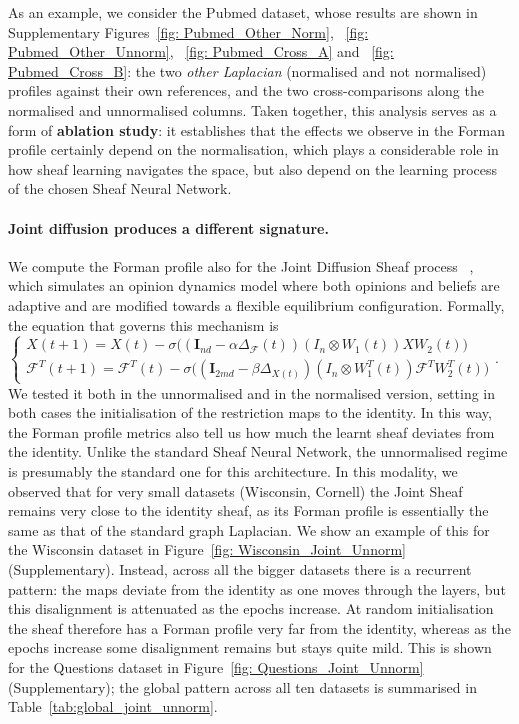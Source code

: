 As an example, we consider the Pubmed dataset, whose results are shown in
Supplementary Figures~\ref{fig: Pubmed_Other_Norm}, ~\ref{fig: Pubmed_Other_Unnorm},
~\ref{fig: Pubmed_Cross_A} and ~\ref{fig: Pubmed_Cross_B}: the two \emph{other
Laplacian} (normalised and not normalised) profiles against their own references, and the two cross-comparisons along
the normalised and unnormalised columns.
\newline 
Taken together, this analysis serves as a form of \textbf{ablation study}: it establishes that the effects we observe in the Forman profile certainly depend on the normalisation, which plays a considerable role in how sheaf learning navigates the space, but also depend on the learning process of the chosen Sheaf Neural Network.

\paragraph{Joint diffusion produces a different signature.}

We compute the Forman profile also for the Joint Diffusion Sheaf process ~\cite{caralt2024jointdiffusionprocessesinductive}, which simulates an opinion dynamics model where both opinions and beliefs are adaptive and are modified towards a flexible equilibrium configuration.
Formally, the equation that governs this mechanism is $\begin{cases}
X(t+1) = X(t) - \sigma\big((\mathbf{I}_{nd} - \alpha \Delta_{\mathcal{F}}(t))(I_n \otimes W_1(t))XW_2(t)\big) \\
\mathcal{F}^T(t+1) = \mathcal{F}^T(t) - \sigma\big((\mathbf{I}_{2md} - \beta \Delta_{X(t)})(I_n \otimes W_1^T(t))\mathcal{F}^TW_2^T(t)\big)
\end{cases}$.
We tested it both in the unnormalised and in the normalised version, setting in both cases the initialisation of the restriction maps to the identity.
In this way, the Forman profile metrics also tell us how much the learnt sheaf deviates from the identity.
Unlike the standard Sheaf Neural Network, the unnormalised regime is presumably the standard one for this architecture.
In this modality, we observed that for very small datasets (Wisconsin, Cornell) the Joint Sheaf remains very close to the identity sheaf, as its Forman profile is essentially the same as that of the standard graph Laplacian. We show an example of this for the Wisconsin dataset in Figure~\ref{fig: Wisconsin_Joint_Unnorm} (Supplementary).
Instead, across all the bigger datasets there is a recurrent pattern: the maps deviate from the identity as one moves through the layers, but this disalignment is attenuated as the epochs increase. At random initialisation the sheaf therefore has a Forman profile very far from the identity, whereas as the epochs increase some disalignment remains but stays quite mild.
This is shown for the Questions dataset in Figure~\ref{fig: Questions_Joint_Unnorm} (Supplementary); the global pattern across all ten datasets is summarised in Table~\ref{tab:global_joint_unnorm}.

